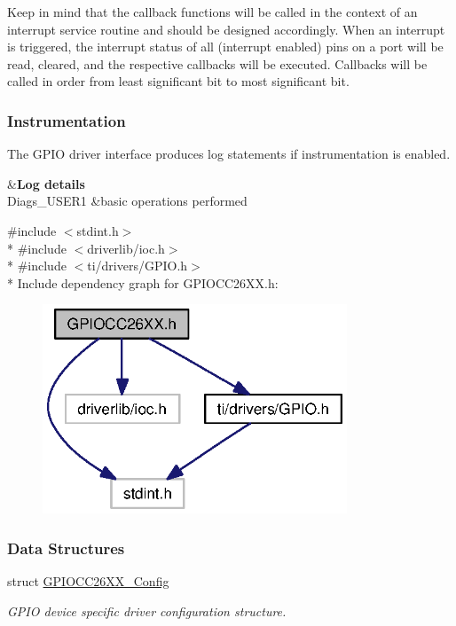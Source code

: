 Keep in mind that the callback functions will be called in the context of an interrupt service routine and should be designed accordingly. When an interrupt is triggered, the interrupt status of all (interrupt enabled) pins on a port will be read, cleared, and the respective callbacks will be executed. Callbacks will be called in order from least significant bit to most significant bit.

\subsubsection*{Instrumentation}

The G\+P\+I\+O driver interface produces log statements if instrumentation is enabled.

\begin{TabularC}{2}
\hline
{}&{\bf Log details  }\\
Diags\+\_\+\+U\+S\+E\+R1 &basic operations performed \\
\end{TabularC}


{\ttfamily \#include $<$stdint.\+h$>$}\\*
{\ttfamily \#include $<$driverlib/ioc.\+h$>$}\\*
{\ttfamily \#include $<$ti/drivers/\+G\+P\+I\+O.\+h$>$}\\*
Include dependency graph for G\+P\+I\+O\+C\+C26\+X\+X.\+h\+:
\nopagebreak
\begin{figure}[H]
\begin{center}
\leavevmode
\includegraphics[width=257pt]{_g_p_i_o_c_c26_x_x_8h__incl}
\end{center}
\end{figure}
\subsubsection*{Data Structures}
\begin{DoxyCompactItemize}
\item 
struct \hyperlink{struct_g_p_i_o_c_c26_x_x___config}{G\+P\+I\+O\+C\+C26\+X\+X\+\_\+\+Config}
\begin{DoxyCompactList}\small\item\em G\+P\+I\+O device specific driver configuration structure. \end{DoxyCompactList}\end{DoxyCompactItemize}
